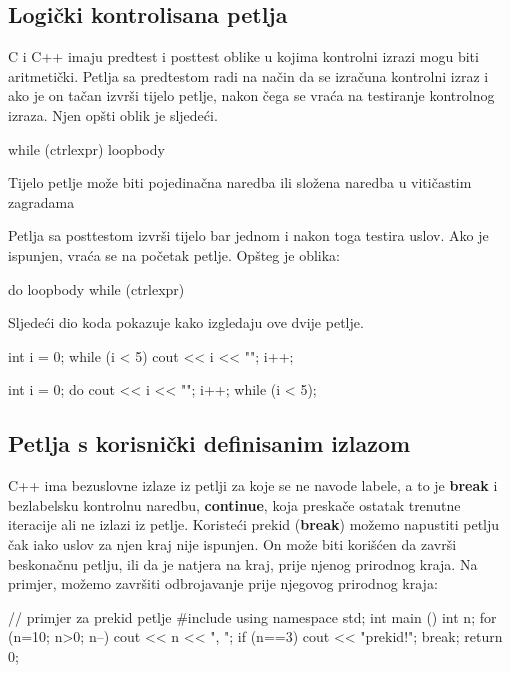 \documentclass[11pt]{book}
\begin{document}
\subsection{Logički kontrolisana petlja}

C i C++ imaju predtest i posttest oblike u kojima kontrolni izrazi mogu biti aritmetički. Petlja sa predtestom radi na način da se izračuna kontrolni izraz i ako je on tačan izvrši tijelo petlje, nakon čega se vraća na testiranje kontrolnog izraza. Njen opšti oblik je sljedeći.

\begin{shortlisting}
  while (ctrlexpr)
  loopbody
\end{shortlisting}

Tijelo petlje može biti pojedinačna naredba ili složena naredba u vitičastim zagradama

Petlja sa posttestom izvrši tijelo bar jednom i nakon toga testira uslov. Ako je ispunjen, vraća se na početak petlje. Opšteg je oblika:

\begin{shortlisting}
  do
  loopbody
  while (ctrlexpr)
\end{shortlisting}

Sljedeći dio koda pokazuje kako izgledaju ove dvije petlje.

\begin{shortlisting}
  int i = 0;
  while (i < 5) {
      cout << i << "\n";
      i++;
    }

  int i = 0;
  do {
      cout << i << "\n";
      i++;
    }
  while (i < 5);
\end{shortlisting}


\subsection{Petlja s korisnički definisanim izlazom}

C++ ima bezuslovne izlaze iz petlji za koje se ne navode labele, a to je \textbf{break} i bezlabelsku kontrolnu naredbu, \textbf{continue}, koja preskače ostatak trenutne iteracije ali ne izlazi iz petlje. Koristeći prekid (\textbf{break}) možemo napustiti petlju čak iako uslov za njen kraj nije ispunjen. On može biti korišćen da završi beskonačnu petlju, ili da je natjera na kraj, prije njenog prirodnog kraja. Na primjer, možemo završiti odbrojavanje prije njegovog prirodnog kraja:

\begin{shortlisting}
  // primjer za prekid petlje
  #include using namespace std;
  int main () {
      int n;
      for (n=10; n>0; n--) {
          cout << n << ", ";
          if (n==3) {
              cout << "prekid!";
              break;
            }
        }
      return 0;
    }
\end{shortlisting}
\end{document}
